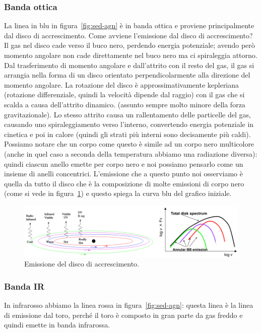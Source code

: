 \subsubsection{Banda ottica}
La linea in blu in figura~\ref{fig:sed-agn} è in banda ottica e proviene principalmente dal disco di accrescimento. Come avviene l'emissione dal disco di accrescimento? Il gas nel disco cade verso il buco nero, perdendo energia potenziale; avendo però momento angolare non cade direttamente nel buco nero ma ci spiraleggia attorno. Dal trasferimento di momento angolare e dall'attrito con il resto del gas, il gas si arrangia nella forma di un disco orientato perpendicolarmente alla direzione del momento angolare. La rotazione del disco è approssimativamente kepleriana (rotazione differenziale, quindi la velocità dipende dal raggio) con il gas che si scalda a causa dell'attrito dinamico. (assunto sempre molto minore della forza gravitazionale). Lo stesso attrito causa un rallentamento delle particelle del gas, causando uno spiraleggiamento verso l'interno, convertendo energia potenziale in cinetica e poi in calore (quindi gli strati più interni sono decisamente più caldi). Possiamo notare che un corpo come questo è simile ad un corpo nero multicolore (anche in quel caso a seconda della temperatura abbiamo una radiazione diversa): quindi ciascun anello emette per corpo nero e noi possiamo pensarlo come un insieme di anelli concentrici. L'emissione che a questo punto noi osserviamo è quella da tutto il disco che è la composizione di molte emissioni di corpo nero (come si vede in figura~\ref{fig:emissione-del-disco-di-accrescimento}) e questo spiega la curva blu del grafico iniziale.

\begin{figure}
    \centering
    \includegraphics[width = \textwidth]{immagini/emissione-del-disco-di-accrescimento.png}
    \caption{Emissione del disco di accrescimento.}
    \label{fig:emissione-del-disco-di-accrescimento}
\end{figure}

\subsubsection{Banda IR}
In infrarosso abbiamo la linea rossa in figura~\ref{fig:sed-agn}: questa linea è la linea di emissione dal toro, perché il toro è composto in gran parte da gas freddo e quindi emette in banda infrarossa. 

